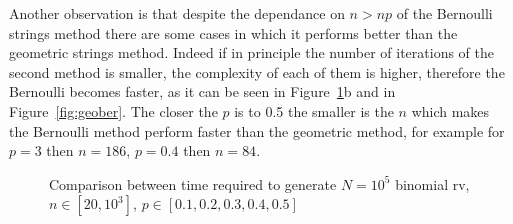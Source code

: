 \documentclass[10pt]{article}
\begin{document}
Another observation is that despite the dependance on $n > np$ of the Bernoulli strings method there are some cases in which it performs better than the geometric strings method. Indeed if in principle the number of iterations of the second method is smaller, the complexity of each of them is higher, therefore the Bernoulli becomes faster, as it can be seen in Figure~\ref{fig:bin}b and in Figure~\ref{fig:geober}. The closer the $p$ is to 0.5 the smaller is the $n$ which makes the Bernoulli method perform faster than the geometric method, for example for $p = 3$ then $n = 186$, $p = 0.4$ then $n=84$.

\begin{figure}[h]
  \centering
  \caption{Comparison between time required to generate $N = 10^5$ binomial rv, $n\in [20, 10^3]$, $p \in [0.1, 0.2, 0.3, 0.4, 0.5]$}
  \label{fig:bin}
\end{figure}
\end{document}
